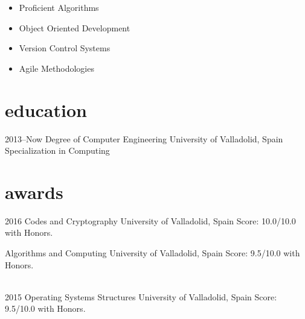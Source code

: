 \documentclass[]{friggeri-cv} %
\begin{document}
\noindent\begin{minipage}[t]{0.5\linewidth}
    \begin{itemize}
    \item{Proficient Algorithms}
    \item{Object Oriented Development}
    \end{itemize}
    \end{minipage}%
    \begin{minipage}[t]{0.5\linewidth}
    \begin{itemize}
    \item{Version Control Systems}
    \item{Agile Methodologies}
    \end{itemize}
\end{minipage}\par\bigskip



\section{education}

\begin{entrylist}


\entry
{2013--Now}
{Degree {\normalfont of Computer Engineering} }
{University of Valladolid, Spain}
{Specialization in Computing}



\end{entrylist}



\section{awards}

\begin{entrylist}


\entry
{2016}
{Codes and Cryptography}
{University of Valladolid, Spain}
{Score: 10.0/10.0 with Honors.}

\entry
{}
{Algorithms and Computing}
{University of Valladolid, Spain}
{Score: 9.5/10.0 with Honors.} 

\\
\entry
{2015}
{Operating Systems Structures}
{University of Valladolid, Spain}
{Score: 9.5/10.0 with Honors.}


\end{entrylist}
\end{document}

